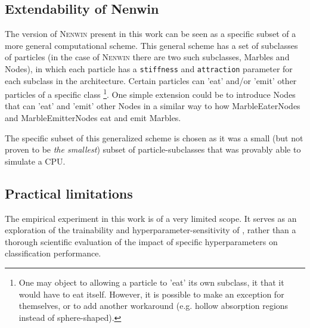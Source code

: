 \subsection{Extendability of Nenwin}
The version of \textsc{Nenwin} present in this work can be seen as a specific subset of a more general computational scheme. This general scheme has a set of subclasses of particles (in the case of \textsc{Nenwin} there are two such subclasses, Marbles and Nodes), in which each particle has a \texttt{stiffness} and \texttt{attraction} parameter for each subclass in the architecture. Certain particles can 'eat' and/or 'emit' other particles of a specific class \footnote{One may object to allowing a particle to 'eat' its own subclass, it that it would have to eat itself. However, it is possible to make an exception for themselves, or to add another workaround (e.g. hollow absorption regions instead of sphere-shaped).}. One simple extension could be to introduce Nodes that can 'eat' and 'emit' other Nodes in a similar way to how MarbleEaterNodes and MarbleEmitterNodes eat and emit Marbles.

The specific subset of this generalized scheme is chosen as it was a small (but not proven to be \textit{the smallest}) subset of particle-subclasses that was provably able to simulate a CPU.

\subsection{Practical limitations}
The empirical experiment in this work is of a very limited scope.
It serves as an exploration of the trainability and hyperparameter-sensitivity of \nenwin,
rather than a thorough scientific evaluation of the impact of specific hyperparameters on classification performance.

